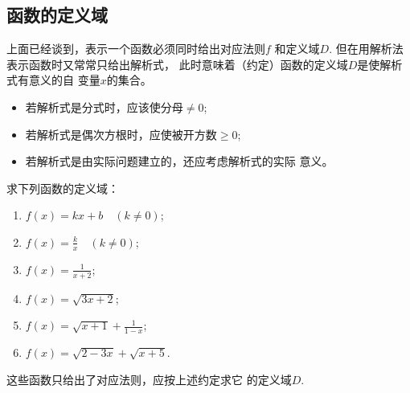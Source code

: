 \subsection{函数的定义域}
上面已经谈到，表示一个函数必须同时给出对应法则$f$
和定义域$D$. 但在用解析法表示函数时又常常只给出解析式，
此时意味着（约定）函数的定义域$D$是使解析式有意义的自
变量$x$的集合。
\begin{itemize}
    \item 若解析式是分式时，应该使分母$\ne 0$;
    \item 若解析式是偶次方根时，应使被开方数$\ge 0$;
    \item 若解析式是由实际问题建立的，还应考虑解析式的实际
意义。
\end{itemize}

\begin{example}
    求下列函数的定义域：
\begin{multicols}{2}
\begin{enumerate}[(1)]
    \item $f(x)=kx+b\quad (k\ne 0)$;
    \item $f(x)=\frac{k}{x}\quad (k\ne 0)$;
    \item $f(x)=\frac{1}{x+2}$;
    \item $f(x)=\sqrt{3x+2}$;
    \item $f(x)=\sqrt{x+1}+\frac{1}{1-x}$;
    \item $f(x)=\sqrt{2-3x}+\sqrt{x+5}$.
\end{enumerate}
\end{multicols}
\end{example}

\begin{analyze}
    这些函数只给出了对应法则，应按上述约定求它
的定义域$D$.
\end{analyze}

